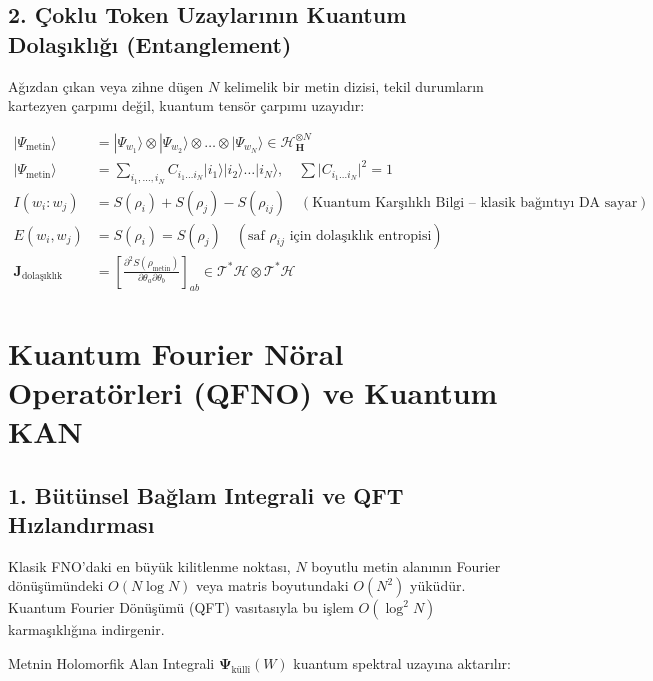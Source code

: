 \documentclass[11pt, a4paper]{article}
\begin{document}
\subsection{2. Çoklu Token Uzaylarının Kuantum Dolaşıklığı (Entanglement)}
Ağızdan çıkan veya zihne düşen $N$ kelimelik bir metin dizisi, tekil durumların kartezyen çarpımı değil, kuantum tensör çarpımı uzayıdır:

\begin{align}
|\Psi_{\text{metin}}\rangle &= |\Psi_{w_1}\rangle \otimes |\Psi_{w_2}\rangle \otimes \dots \otimes |\Psi_{w_N}\rangle \in \mathcal{H}_{\mathbf{H}}^{\otimes N} \\
|\Psi_{\text{metin}}\rangle &= \sum_{i_1, \dots, i_N} C_{i_1 \dots i_N} |i_1\rangle |i_2\rangle \dots |i_N\rangle, \quad \sum |C_{i_1 \dots i_N}|^2 = 1 \\
I(w_i : w_j) &= S(\rho_i) + S(\rho_j) - S(\rho_{ij}) \quad (\text{Kuantum Karşılıklı Bilgi -- klasik bağıntıyı DA sayar}) \\
E(w_i, w_j) &= S(\rho_i) = S(\rho_j) \quad (\text{saf }\rho_{ij}\text{ için dolaşıklık entropisi}) \\
\mathbf{J}_{\text{dolaşıklık}} &= \left[ \frac{\partial^2 S(\rho_{\text{metin}})}{\partial \theta_a \partial \theta_b} \right]_{ab} \in \mathcal{T}^*\mathcal{H} \otimes \mathcal{T}^*\mathcal{H}
\end{align}

\section{Kuantum Fourier Nöral Operatörleri (QFNO) ve Kuantum KAN}

\subsection{1. Bütünsel Bağlam Integrali ve QFT Hızlandırması}
Klasik FNO'daki en büyük kilitlenme noktası, $N$ boyutlu metin alanının Fourier dönüşümündeki $O(N \log N)$ veya matris boyutundaki $O(N^2)$ yüküdür. Kuantum Fourier Dönüşümü (QFT) vasıtasıyla bu işlem $O(\log^2 N)$ karmaşıklığına indirgenir.

Metnin Holomorfik Alan Integrali $\mathbf{\Psi}_{\text{küllî}}(W)$ kuantum spektral uzayına aktarılır:
\end{document}
